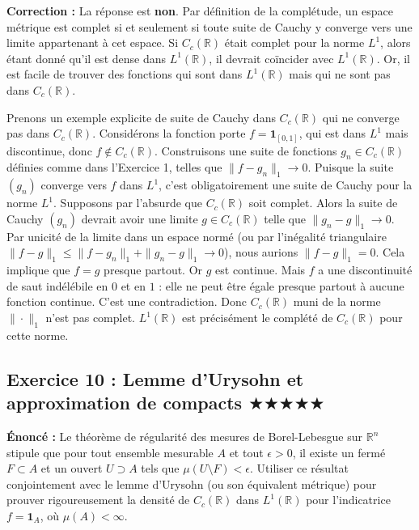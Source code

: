 \documentclass[11pt,a4paper]{article}
\begin{document}
\textbf{Correction :}
La réponse est \textbf{non}.
Par définition de la complétude, un espace métrique est complet si et seulement si toute suite de Cauchy y converge vers une limite appartenant à cet espace.
Si $C_c(\mathbb{R})$ était complet pour la norme $L^1$, alors étant donné qu'il est dense dans $L^1(\mathbb{R})$, il devrait coïncider avec $L^1(\mathbb{R})$.
Or, il est facile de trouver des fonctions qui sont dans $L^1(\mathbb{R})$ mais qui ne sont pas dans $C_c(\mathbb{R})$.

Prenons un exemple explicite de suite de Cauchy dans $C_c(\mathbb{R})$ qui ne converge pas dans $C_c(\mathbb{R})$.
Considérons la fonction porte $f = \mathbf{1}_{[0,1]}$, qui est dans $L^1$ mais discontinue, donc $f \notin C_c(\mathbb{R})$.
Construisons une suite de fonctions $g_n \in C_c(\mathbb{R})$ définies comme dans l'Exercice 1, telles que $\| f - g_n \|_1 \to 0$.
Puisque la suite $(g_n)$ converge vers $f$ dans $L^1$, c'est obligatoirement une suite de Cauchy pour la norme $L^1$.
Supposons par l'absurde que $C_c(\mathbb{R})$ soit complet. Alors la suite de Cauchy $(g_n)$ devrait avoir une limite $g \in C_c(\mathbb{R})$ telle que $\| g_n - g \|_1 \to 0$.
Par unicité de la limite dans un espace normé (ou par l'inégalité triangulaire $\| f - g \|_1 \le \| f - g_n \|_1 + \| g_n - g \|_1 \to 0$), nous aurions $\| f - g \|_1 = 0$.
Cela implique que $f = g$ presque partout.
Or $g$ est continue. Mais $f$ a une discontinuité de saut indélébile en $0$ et en $1$ : elle ne peut être égale presque partout à aucune fonction continue.
C'est une contradiction. Donc $C_c(\mathbb{R})$ muni de la norme $\| \cdot \|_1$ n'est pas complet.
$L^1(\mathbb{R})$ est précisément le complété de $C_c(\mathbb{R})$ pour cette norme.


\subsection*{Exercice 10 : Lemme d'Urysohn et approximation de compacts \quad $\bigstar\bigstar\bigstar\bigstar\bigstar$}

\textbf{Énoncé :}
Le théorème de régularité des mesures de Borel-Lebesgue sur $\mathbb{R}^n$ stipule que pour tout ensemble mesurable $A$ et tout $\epsilon > 0$, il existe un fermé $F \subset A$ et un ouvert $U \supset A$ tels que $\mu(U \setminus F) < \epsilon$.
Utiliser ce résultat conjointement avec le lemme d'Urysohn (ou son équivalent métrique) pour prouver rigoureusement la densité de $C_c(\mathbb{R})$ dans $L^1(\mathbb{R})$ pour l'indicatrice $f = \mathbf{1}_A$, où $\mu(A) < \infty$.
\end{document}
